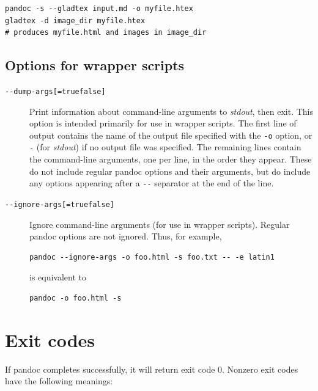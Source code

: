 \documentclass[
]{article}
\begin{document}
\begin{description}
\begin{verbatim}
pandoc -s --gladtex input.md -o myfile.htex
gladtex -d image_dir myfile.htex
# produces myfile.html and images in image_dir
\end{verbatim}
\end{description}

\hypertarget{options-for-wrapper-scripts}{%
\subsection{Options for wrapper
scripts}\label{options-for-wrapper-scripts}}

\begin{description}
\item[\texttt{-\/-dump-args{[}=true\textbar{}false{]}}]
Print information about command-line arguments to \emph{stdout}, then
exit. This option is intended primarily for use in wrapper scripts. The
first line of output contains the name of the output file specified with
the \texttt{-o} option, or \texttt{-} (for \emph{stdout}) if no output
file was specified. The remaining lines contain the command-line
arguments, one per line, in the order they appear. These do not include
regular pandoc options and their arguments, but do include any options
appearing after a \texttt{-\/-} separator at the end of the line.
\item[\texttt{-\/-ignore-args{[}=true\textbar{}false{]}}]
Ignore command-line arguments (for use in wrapper scripts). Regular
pandoc options are not ignored. Thus, for example,

\begin{verbatim}
pandoc --ignore-args -o foo.html -s foo.txt -- -e latin1
\end{verbatim}

is equivalent to

\begin{verbatim}
pandoc -o foo.html -s
\end{verbatim}
\end{description}

\hypertarget{exit-codes}{%
\section{Exit codes}\label{exit-codes}}

If pandoc completes successfully, it will return exit code 0. Nonzero
exit codes have the following meanings:
\end{document}
